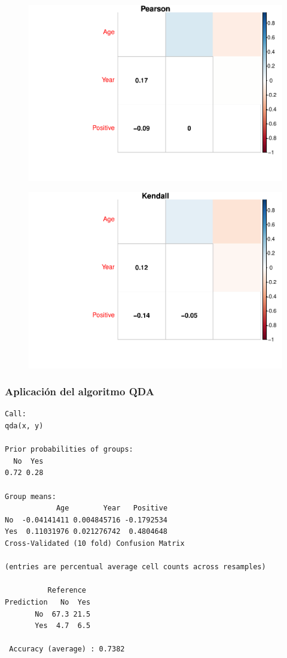 \begin{figure}[H]\center\includegraphics[width=.9\linewidth]{img/Clasificacion_files/figure-latex/unnamed-chunk-28-1}\caption{}\end{figure}

\begin{figure}[H]\center\includegraphics[width=.9\linewidth]{img/Clasificacion_files/figure-latex/unnamed-chunk-28-2}\caption{}\end{figure}

\subsubsection{Aplicación del algoritmo QDA}

\begin{verbatim}
Call:
qda(x, y)

Prior probabilities of groups:
  No  Yes 
0.72 0.28 

Group means:
            Age        Year   Positive
No  -0.04141411 0.004845716 -0.1792534
Yes  0.11031976 0.021276742  0.4804648
Cross-Validated (10 fold) Confusion Matrix 

(entries are percentual average cell counts across resamples)
 
          Reference
Prediction   No  Yes
       No  67.3 21.5
       Yes  4.7  6.5
                            
 Accuracy (average) : 0.7382
\end{verbatim}

